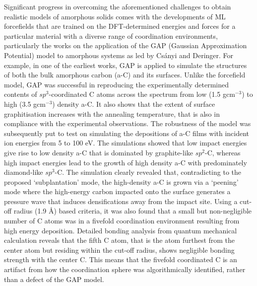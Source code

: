 Significant progress in overcoming the aforementioned challenges to obtain realistic models of amorphous solids comes with the developments of ML forcefields that are trained on the DFT-determined energies and forces for a particular material with a diverse range of coordination environments, particularly the works on the application of the GAP (Gaussian Approximation Potential) model\cite{bartok2010gaussian} to amorphous systems as led by Cs\'{a}nyi and Deringer. For example, in one of the earliest works,\cite{deringer2017machine} GAP is applied to simulate the structures of both the bulk amorphous carbon (a-C) and its surfaces. Unlike the forcefield model, GAP was successful in reproducing the experimentally determined contents of $sp^3$-coordinated C atoms across the spectrum from low (1.5 gcm$^{-3}$) to high (3.5 gcm$^{-3}$) density a-C. It also shows that the extent of surface graphitisation increases with the annealing temperature, that is also in compliance with the experimental observations. The robustness of the model was subsequently put to test on simulating the depositions of a-C films with incident ion energies from 5 to 100 eV.\cite{caro2018growth,caro2020machine} The simulations showed that low impact energies give rise to low density a-C that is dominated by graphite-like $sp^2$-C, whereas high impact energies lead to the growth of high density a-C with predominately diamond-like $sp^3$-C. The simulation clearly revealed that, contradicting to the proposed `subplantation' mode, the high-density a-C is grown via a `peening' mode where the high-energy carbon impacted onto the surface generates a pressure wave that induces densifications away from the impact site. Using a cut-off radius (1.9 $\mbox{\AA}$) based criteria, it was also found that a small but non-negligible number of C atoms was in a fivefold coordination environment resulting from high energy deposition. Detailed bonding analysis from quantum mechanical calculation reveals that the fifth C atom, that is the atom furthest from the center atom but residing within the cut-off radius, shows negligible bonding strength with the center C. This means that the fivefold coordinated C is an artifact from how the coordination sphere was algorithmically identified, rather than a defect of the GAP model. 

